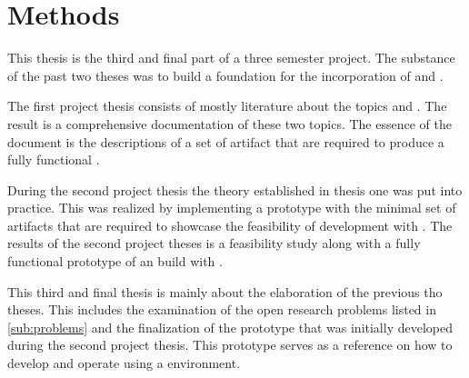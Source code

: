 \chapter{Methods}

This thesis is the third and final part of a three semester project. The
substance of the past two theses was to build a foundation for the incorporation
of \mss{} and \ogs{}. 

The first project thesis consists of mostly literature about the topics \ogs{}
and \mss{}. The result is a comprehensive documentation of these two topics. The
essence of the document is the descriptions of a set of artifact that are
required to produce a fully functional \og{}.

During the second project thesis the theory established in thesis one was put
into practice. This was realized by implementing a prototype with the minimal
set of artifacts that are required to showcase the feasibility of \og{}
development with \mss{}. The results of the second project theses is a
feasibility study along with a fully functional prototype of an \og{} build
with \mss{}.

This third and final thesis is mainly about the elaboration of the previous tho
theses. This includes the examination of the open research problems listed in
\autoref{sub:problems} and the finalization of the prototype that was initially
developed during the second project thesis. This prototype serves as a reference
on how to develop and operate \ogs{} using a \mss{} environment.

























